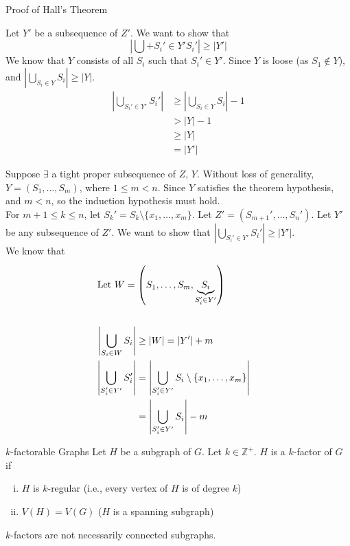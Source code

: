 \documentclass[10pt]{extarticle}
\begin{document}
{\begin{problem}{Proof of Hall's Theorem}
\begin{description}
\begin{description}[font=\normalfont\scshape]
            Let $Y'$ be a subsequence of $Z'$. We want to show that
            \[
              \left|\bigcup+{S_i'\in Y'} S_i' \right| \geq |Y'|
            \] 
            We know that $Y$ consists of all $S_i$ such that $S_i'\in Y'$. Since $Y$ is loose (as $S_1\notin Y$), and $\left|\bigcup_{S_i\in Y}S_i\right| \geq |Y|$.
            \begin{align*}
              \left|\bigcup_{S_i'\in Y'}S_i'\right| &\geq \left|\bigcup_{S_i\in Y}S_i\right|-1\\
              &> |Y| - 1\\
              &\geq |Y|\\
              &= |Y'|
            \end{align*}
          \item[Case 2:] Suppose $\exists$ a tight proper subsequence of $Z$, $Y$. Without loss of generality, $Y = (S_1,\dots,S_m)$, where $1\leq m < n$. Since $Y$ satisfies the theorem hypothesis, and $m < n$, so the induction hypothesis must hold.\\

            For $m+1 \leq k \leq n$, let $S_k' = S_k \setminus \{x_1,\dots,x_m\}$. Let $Z' = (S_{m+1}',\dots,S_n')$. Let $Y'$ be any subsequence of $Z'$. We want to show that $\left|\bigcup_{S_i'\in Y'} S_i'\right| \geq |Y'|$.\\

            We know that
            \begin{align*}
              \shortintertext{Let $W = \left(S_1,\dots,S_m,\underbrace{S_i}_{S_i'\in Y'}\right)$}\\
              \left|\bigcup_{S_i\in W}S_i\right| &\geq |W| = |Y'| + m\\
              \left|\bigcup_{S_i'\in Y'}S_i'\right| &= \left|\bigcup_{S_i' \in Y'} S_i \setminus \{x_1,\dots,x_m\}\right|\\
                                                    &= \left|\bigcup_{S_i' \in Y'} S_i\right| - m
            \end{align*}
        \end{description}
    \end{description}
  \end{problem}
  \begin{problem}{$k$-factorable Graphs}
    Let $H$ be a subgraph of $G$. Let $k\in\mathbb{Z}^+$. $H$ is a $k$-factor of $G$ if
    \begin{enumerate}[(i)]
      \item $H$ is $k$-regular (i.e., every vertex of $H$ is of degree $k$)
      \item $V(H) = V(G)$ ($H$ is a spanning subgraph)
    \end{enumerate}
    $k$-factors are not necessarily connected subgraphs.\\


\end{problem}}
\end{document}
